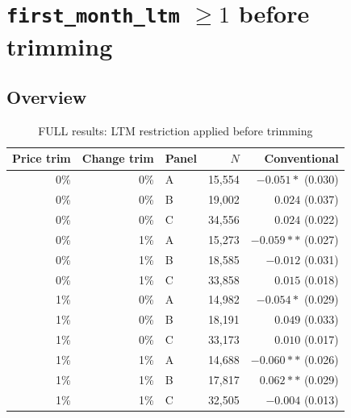 \section{\texttt{first\_month\_ltm} $\geq 1$ before trimming}
\subsection{Overview}
\begin{table}[!htbp]
\centering
\caption{FULL results: LTM restriction applied before trimming}
\label{tab:ltm1:panels_abc_trim_grid_full_bal}
\small
\begin{tabular}{rrlrr}
\toprule
Price trim & Change trim & Panel & $N$ & Conventional \\
\midrule
0\% & 0\% & A & 15,554 & $-0.051*$ (0.030) \\
0\% & 0\% & B & 19,002 & $0.024$ (0.037) \\
0\% & 0\% & C & 34,556 & $0.024$ (0.022) \\
0\% & 1\% & A & 15,273 & $-0.059**$ (0.027) \\
0\% & 1\% & B & 18,585 & $-0.012$ (0.031) \\
0\% & 1\% & C & 33,858 & $0.015$ (0.018) \\
1\% & 0\% & A & 14,982 & $-0.054*$ (0.029) \\
1\% & 0\% & B & 18,191 & $0.049$ (0.033) \\
1\% & 0\% & C & 33,173 & $0.010$ (0.017) \\
1\% & 1\% & A & 14,688 & $-0.060**$ (0.026) \\
1\% & 1\% & B & 17,817 & $0.062**$ (0.029) \\
1\% & 1\% & C & 32,505 & $-0.004$ (0.013) \\
\bottomrule
\end{tabular}
\end{table}

